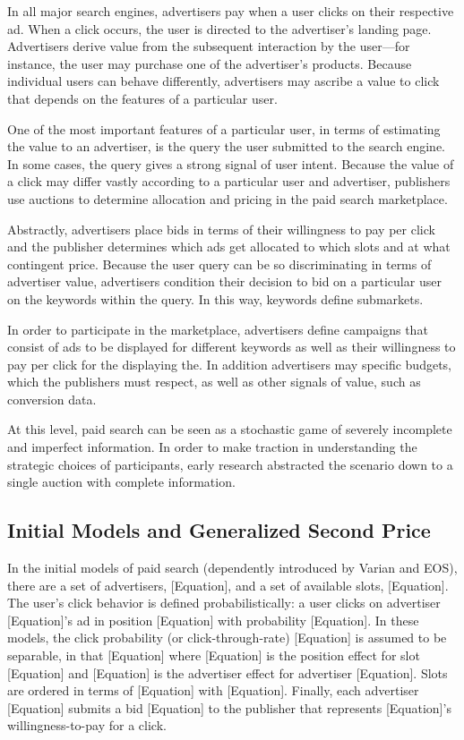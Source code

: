 \documentclass[prodmode,acmtist]{acmsmall} %
\begin{document}
In all major search engines, advertisers pay when a user clicks on their respective ad.  
When a click occurs, the user is directed to the advertiser’s landing page.  
Advertisers derive value from the subsequent interaction by the user---for instance, the user may purchase one of the advertiser’s products.  
Because individual users can behave differently, advertisers may ascribe a value to click that depends on the features of a particular user. 

One of the most important features of a particular user, in terms of estimating the value to an advertiser, is the query the user submitted to the search engine.  
In some cases, the query gives a strong signal of user intent.  
Because the value of a click may differ vastly according to a particular user and advertiser, publishers use auctions to determine allocation and pricing in the paid search marketplace. 

Abstractly, advertisers place bids in terms of their willingness to pay per click and the publisher determines which ads get allocated to which slots and at what contingent price.  
Because the user query can be so discriminating in terms of advertiser value, advertisers condition their decision to bid on a particular user on the keywords within the query.  
In this way, keywords define submarkets. 

In order to participate in the marketplace, advertisers define campaigns that consist of ads to be displayed for different keywords as well as their willingness to pay per click for the displaying the.  
In addition advertisers may specific budgets, which the publishers must respect, as well as other signals of value, such as conversion data. 

At this level, paid search can be seen as a stochastic game of severely incomplete and imperfect information.  
In order to make traction in understanding the strategic choices of participants, early research abstracted the scenario down to a single auction with complete information. 

\subsection{Initial Models and Generalized Second Price} %
\label{sub:initial_models_and_generalized_second_price}

In the initial models of paid search (dependently introduced by Varian and EOS), there are a set of advertisers, [Equation], and a set of available slots, [Equation].  
The user’s click behavior is defined probabilistically: a user clicks on advertiser [Equation]’s ad in position [Equation] with probability [Equation].  
In these models, the click probability (or click-through-rate) [Equation] is assumed to be separable, in that  [Equation] where [Equation] is the position effect for slot [Equation] and [Equation] is the advertiser effect for advertiser [Equation].  
Slots are ordered in terms of [Equation] with [Equation].    
Finally, each advertiser [Equation] submits a bid [Equation] to the publisher that represents [Equation]’s willingness-to-pay for a click. 
\end{document}

